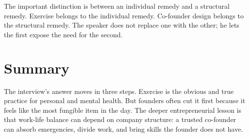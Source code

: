 The important distinction is between an individual remedy and a structural remedy. Exercise belongs to the individual remedy. Co-founder design belongs to the structural remedy. The speaker does not replace one with the other; he lets the first expose the need for the second.

\section{Summary}

The interview's answer moves in three steps. Exercise is the obvious and true practice for personal and mental health. But founders often cut it first because it feels like the most fungible item in the day. The deeper entrepreneurial lesson is that work-life balance can depend on company structure: a trusted co-founder can absorb emergencies, divide work, and bring skills the founder does not have.
